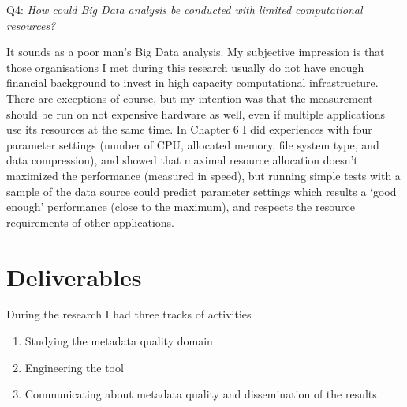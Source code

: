 Q4: \emph{How could Big Data analysis be conducted with limited computational resources?}

It sounds as a poor man's Big Data analysis. My subjective impression is that those organisations I met during this research usually do not have enough financial background to invest in high capacity computational infrastructure. There are exceptions of course, but my intention was that the measurement should be run on not expensive hardware as well, even if multiple applications use its resources at the same time. In Chapter 6 I did experiences with four parameter settings (number of CPU, allocated memory, file system type, and data compression), and showed that maximal resource allocation doesn't maximized the performance (measured in speed), but running simple tests with a sample of the data source could predict parameter settings which results a `good enough' performance (close to the maximum), and respects the resource requirements of other applications.


\section{Deliverables}

During the research I had three tracks of activities

\begin{enumerate}
  \setlength{\parskip}{0pt}
  \setlength{\itemsep}{0pt plus 1pt}
\item Studying the metadata quality domain
\item Engineering the tool
\item Communicating about metadata quality and dissemination of the results
\end{enumerate}

